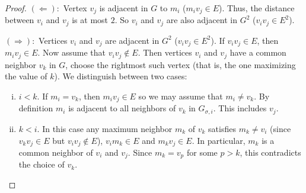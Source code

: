 \documentclass[]{elsarticle}
\begin{document}
\begin{proof}
$(\Leftarrow):$ Vertex $v_j$ is adjacent in $G$ to $m_i$ ($m_iv_j \in E$). 
Thus, the distance between $v_i$ and $v_j$ is at most $2$. 
So $v_i$ and $v_j$ are also adjacent in $G^2$ ($v_iv_j \in E^2$).

$(\Rightarrow):$ Vertices $v_i$ and $v_j$ are adjacent in $G^2$ ($v_iv_j \in E^2$).
If $v_iv_j \in E$, then $m_iv_j\in E$.
Now assume that $v_iv_j \notin E$.
Then vertices $v_i$ and $v_j$ have a common neighbor $v_k$ in $G$, choose the rightmost such vertex (that is,
the one maximizing the value of $k$).
We distinguish between two cases:
\begin{enumerate}[(i)]
    \item $i<k$.
    If $m_i= v_k$, then $m_iv_j \in E$ so we may assume that $m_i\neq v_k$.
    By definition $m_i$ is adjacent to all neighbors of $v_k$ in $G_{\sigma,i}$. 
    This includes $v_j$.

    \item $k<i$. In this case any maximum neighbor $m_k$ of $v_k$ satisfies $m_k\neq v_i$ (since $v_kv_j\in E$ but $v_iv_j\not \in E$), $v_im_k \in E$ and $m_kv_j \in E$. 
    In particular, $m_k$ is a common neighbor of $v_i$ and $v_j$. 
    Since $m_k = v_p$ for some $p>k$, this contradicts the choice of $v_k$.
\end{enumerate}
\end{proof}
\end{document}
